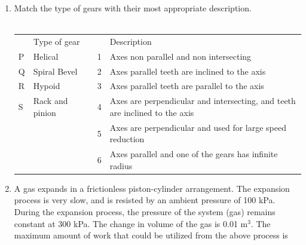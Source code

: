 \documentclass[journal,12pt,onecolumn]{IEEEtran}
\begin{document}
\begin{enumerate}
    \item Match the type of gears with their most appropriate description.\\\\
          \begin{tabular}{|p{0.2in}|p{1in}|p{0.2in}|p{0.2in}|p{3in}|}
              \hline
                & Type of gear    &  &   & Description                                                                 \\
              \cline{1-2}\cline{4-5}
              P & Helical         &  & 1 & Axes non parallel and non intersecting                                      \\
              \cline{1-2}\cline{4-5}
              Q & Spiral Bevel    &  & 2 & Axes parallel teeth are inclined to the axis                                \\
              \cline{1-2}\cline{4-5}
              R & Hypoid          &  & 3 & Axes parallel teeth are parallel to the axis                                \\
              \cline{1-2}\cline{4-5}
              S & Rack and pinion &  & 4 & Axes are perpendicular and intersecting, and teeth are inclined to the axis \\
              \cline{1-2}\cline{4-5}
                &                 &  & 5 & Axes are perpendicular and used for large speed reduction                   \\
              \cline{1-2}\cline{4-5}
                &                 &  & 6 & Axes parallel and one of the gears has infinite radius                      \\
              \cline{1-2}\cline{4-5}
          \end{tabular}

          \begin{enumerate}
          \end{enumerate}

    \item A gas expands in a frictionless piston-cylinder arrangement. The expansion process is very slow, and is resisted by an ambient pressure of 100 kPa. During the expansion process, the pressure of the system (gas) remains constant at 300 kPa. The change in volume of the gas is 0.01 m$^3$. The maximum amount of work that could be utilized from the above process is\\


\end{enumerate}
\end{document}
